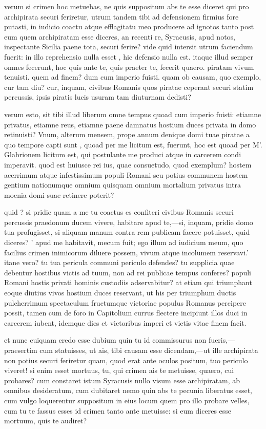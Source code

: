  verum si crimen hoc metuebas, ne quis suppositum abs te esse diceret qui pro archipirata securi feriretur, utrum tandem tibi ad defensionem firmius fore putasti, in iudicio coactu atque efflagitatu meo producere ad ignotos tanto post eum quem archipiratam esse diceres, an recenti re, Syracusis, apud notos, inspectante Sicilia paene tota, securi ferire? vide quid intersit utrum faciendum fuerit: in illo reprehensio nulla esset , hic defensio nulla est. itaque illud semper omnes fecerunt, hoc quis ante te, quis praeter te, fecerit quaero. piratam vivum tenuisti. quem ad finem? dum cum imperio fuisti. quam ob causam, quo exemplo, cur tam diu? cur, inquam, civibus Romanis quos piratae ceperant securi statim percussis, ipsis piratis lucis usuram tam diuturnam dedisti?

 verum esto, sit tibi illud liberum omne tempus quoad cum imperio fuisti: etiamne privatus, etiamne reus, etiamne paene damnatus hostium duces privata in domo retinuisti? Vnum, alterum mensem, prope annum denique domi tuae piratae a quo tempore capti sunt , quoad per me licitum est, fuerunt, hoc est quoad per M'. Glabrionem licitum est, qui postulante me produci atque in carcerem condi imperavit. quod est huiusce rei ius, quae consuetudo, quod exemplum? hostem acerrimum atque infestissimum populi Romani seu potius communem hostem gentium nationumque omnium quisquam omnium mortalium privatus intra moenia domi suae retinere poterit?

 quid ? si pridie quam a me tu coactus es confiteri civibus Romanis securi percussis praedonum ducem vivere, habitare apud te,—si, inquam, pridie domo tua profugisset, si aliquam manum contra rem publicam facere potuisset, quid diceres? ' apud me habitavit, mecum fuit; ego illum ad iudicium meum, quo facilius crimen inimicorum diluere possem, vivum atque incolumem reservavi.' itane vero? tu tua pericula communi periculo defendes? tu supplicia quae debentur hostibus victis ad tuum, non ad rei publicae tempus conferes? populi Romani hostis privati hominis custodiis adservabitur? at etiam qui triumphant eoque diutius vivos hostium duces reservant, ut his per triumphum ductis pulcherrimum spectaculum fructumque victoriae populus Romanus percipere possit, tamen cum de foro in Capitolium currus flectere incipiunt illos duci in carcerem iubent, idemque dies et victoribus imperi et victis vitae finem facit.

 et nunc cuiquam credo esse dubium quin tu id commissurus non fueris,—praesertim cum statuisses, ut ais, tibi causam esse dicendam,—ut ille archipirata non potius securi feriretur quam, quod erat ante oculos positum, tuo periculo viveret! si enim esset mortuus, tu, qui crimen ais te metuisse, quaero, cui probares? cum constaret istum Syracusis nullo visum esse archipiratam, ab omnibus desideratum, cum dubitaret nemo quin abs te pecunia liberatus esset, cum vulgo loquerentur suppositum in eius locum quem pro illo probare velles, cum tu te fassus esses id crimen tanto ante metuisse: si eum diceres esse mortuum, quis te audiret?

